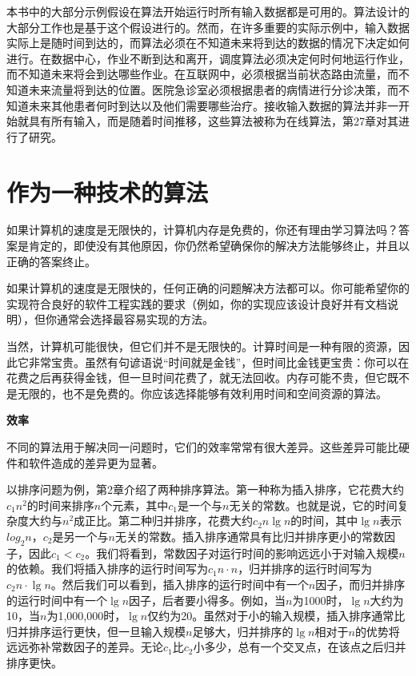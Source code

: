\documentclass[lang=cn,newtx,10pt,scheme=chinese]{elegantbook}
\begin{document}
本书中的大部分示例假设在算法开始运行时所有输入数据都是可用的。算法设计的大部分工作也是基于这个假设进行的。然而，在许多重要的实际示例中，输入数据实际上是随时间到达的，而算法必须在不知道未来将到达的数据的情况下决定如何进行。在数据中心，作业不断到达和离开，调度算法必须决定何时何地运行作业，而不知道未来将会到达哪些作业。在互联网中，必须根据当前状态路由流量，而不知道未来流量将到达的位置。医院急诊室必须根据患者的病情进行分诊决策，而不知道未来其他患者何时到达以及他们需要哪些治疗。接收输入数据的算法并非一开始就具有所有输入，而是随着时间推移，这些算法被称为在线算法，第27章对其进行了研究。

\section{作为一种技术的算法}

如果计算机的速度是无限快的，计算机内存是免费的，你还有理由学习算法吗？答案是肯定的，即使没有其他原因，你仍然希望确保你的解决方法能够终止，并且以正确的答案终止。

如果计算机的速度是无限快的，任何正确的问题解决方法都可以。你可能希望你的实现符合良好的软件工程实践的要求（例如，你的实现应该设计良好并有文档说明），但你通常会选择最容易实现的方法。

当然，计算机可能很快，但它们并不是无限快的。计算时间是一种有限的资源，因此它非常宝贵。虽然有句谚语说“时间就是金钱”，但时间比金钱更宝贵：你可以在花费之后再获得金钱，但一旦时间花费了，就无法回收。内存可能不贵，但它既不是无限的，也不是免费的。你应该选择能够有效利用时间和空间资源的算法。

\textbf{效率}

不同的算法用于解决同一问题时，它们的效率常常有很大差异。这些差异可能比硬件和软件造成的差异更为显著。

以排序问题为例，第2章介绍了两种排序算法。第一种称为插入排序，它花费大约$c_1n^2$的时间来排序$n$个元素，其中$c_1$是一个与$n$无关的常数。也就是说，它的时间复杂度大约与$n^2$成正比。第二种归并排序，花费大约$c_2n\lg n$的时间，其中$\lg n$表示$log_2n$，$c_2$是另一个与$n$无关的常数。插入排序通常具有比归并排序更小的常数因子，因此$c_1 < c_2$。我们将看到，常数因子对运行时间的影响远远小于对输入规模$n$的依赖。我们将插入排序的运行时间写为$c_1n \cdot n$，归并排序的运行时间写为$c_2n \cdot \lg n$。然后我们可以看到，插入排序的运行时间中有一个$n$因子，而归并排序的运行时间中有一个$\lg n$因子，后者要小得多。例如，当$n$为1000时，$\lg n$大约为10，当$n$为1,000,000时，$\lg n$仅约为20。虽然对于小的输入规模，插入排序通常比归并排序运行更快，但一旦输入规模$n$足够大，归并排序的$\lg n$相对于$n$的优势将远远弥补常数因子的差异。无论$c_1$比$c_2$小多少，总有一个交叉点，在该点之后归并排序更快。
\end{document}
